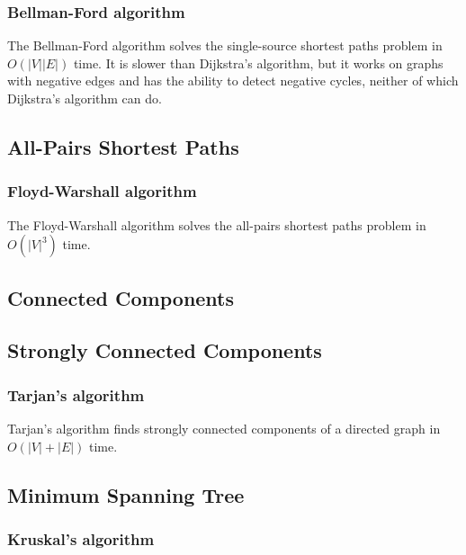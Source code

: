 \documentclass[10pt,a4paper,titlepage]{article}
\begin{document}
			\subsubsection{Bellman-Ford algorithm}
				The Bellman-Ford algorithm solves the single-source shortest paths problem in $O(|V||E|)$ time. It is slower than Dijkstra's algorithm, but it works on graphs with negative edges and has the ability to detect negative cycles, neither of which Dijkstra's algorithm can do.
				
		\subsection{All-Pairs Shortest Paths}
			\subsubsection{Floyd-Warshall algorithm}
				The Floyd-Warshall algorithm solves the all-pairs shortest paths problem in $O(|V|^3)$ time.
				
		\subsection{Connected Components}
		\subsection{Strongly Connected Components}
			\subsubsection{Tarjan's algorithm}
				Tarjan's algorithm finds strongly connected components of a directed graph in $O(|V|+|E|)$ time.
				
		\subsection{Minimum Spanning Tree}
			\subsubsection{Kruskal's algorithm}
				
\end{document}
